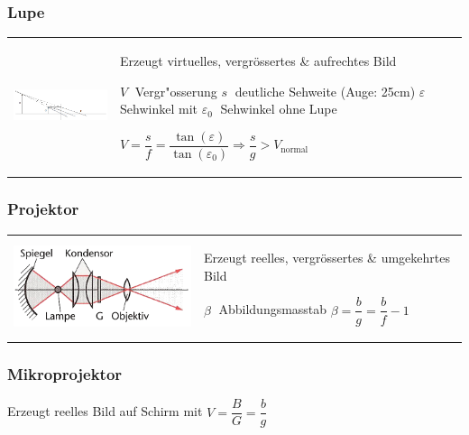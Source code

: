 \subsubsection{Lupe  }
\begin{tabular}{lll}
  \parbox{7cm}{\includegraphics[width=7cm]{./bilder/lupe.png}} &
  \parbox{11cm}{
    Erzeugt virtuelles, vergrössertes \& aufrechtes Bild \\
    \\
    $V \;$ Vergr"osserung \qquad $s \;$ deutliche Sehweite (Auge: 25cm)\\
    \qquad $\varepsilon \;$ Sehwinkel mit \qquad $\varepsilon_0 \;$ Sehwinkel
    ohne Lupe \\
    \\
    $V=\dfrac{s}{f}=\dfrac{\tan(\varepsilon)}{\tan(\varepsilon_0)}\Rightarrow\dfrac{s}{g}>
    V_{\text{normal}}$ }
\end{tabular}
\subsubsection{Projektor }
\begin{tabular}{ll}
\parbox{6cm}{
  \includegraphics[width=6cm]{./bilder/projektor.png}} &
\parbox{12cm}{
  Erzeugt reelles, vergrössertes \& umgekehrtes Bild \\
  \\
  $\beta \;$ Abbildungsmasstab \\
  $\beta = \dfrac{b}{g} = \dfrac{b}{f}-1$}
\end{tabular}

\subsubsection{Mikroprojektor} 
Erzeugt reelles Bild auf Schirm mit $V=\dfrac{B}{G}=\dfrac{b}{g}$\\

